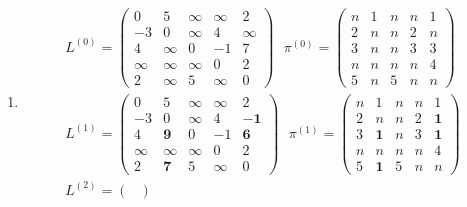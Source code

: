 \documentclass[11pt,a4paper]{article}
\begin{document}
\begin{loesung}
    \begin{enumerate}
        \item 
        \begin{align*}
            L^{(0)} = 
            \begin{pmatrix}
                0 & 5 & \infty & \infty & 2 \\
                -3 & 0 & \infty & 4 & \infty \\
                4 & \infty & 0 & -1 & 7 \\
                \infty & \infty & \infty & 0 & 2 \\
                2 & \infty & 5 & \infty & 0
            \end{pmatrix}
            \,\,\,\,
            \pi^{(0)} = 
            \begin{pmatrix}
                n & 1 & n & n & 1 \\
                2 & n & n & 2 & n \\
                3 & n & n & 3 & 3 \\
                n & n & n & n & 4 \\
                5 & n & 5 & n & n
            \end{pmatrix}
            \\
            L^{(1)} = 
            \begin{pmatrix}
                0 & 5 & \infty & \infty & 2 \\
                -3 & 0 & \infty & 4 & \mathbf{-1} \\
                4 & \mathbf{9} & 0 & -1 & \mathbf{6} \\
                \infty & \infty & \infty & 0 & 2 \\
                2 & \mathbf{7} & 5 & \infty & 0
            \end{pmatrix}
            \,\,\,\,
            \pi^{(1)} = 
            \begin{pmatrix}
                n & 1 & n & n & 1 \\
                2 & n & n & 2 & \mathbf{1} \\
                3 & \mathbf{1} & n & 3 & \mathbf{1} \\
                n & n & n & n & 4 \\
                5 & \mathbf{1} & 5 & n & n
            \end{pmatrix}
            \\
            L^{(2)} =
            \begin{pmatrix}

\end{pmatrix}
\end{align*}
\end{enumerate}
\end{loesung}
\end{document}
